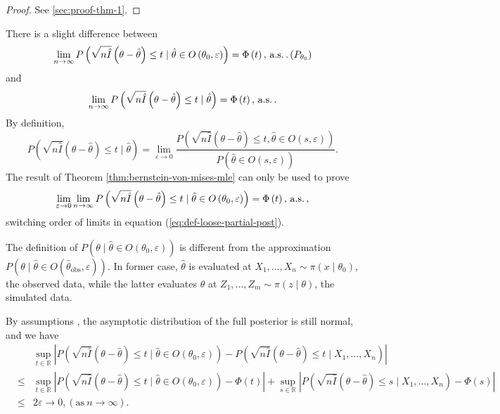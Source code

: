 \begin{proof}
See  \ref{sec:proof-thm-1}.\end{proof}
\begin{rem}
There is a slight difference between 
\[
\lim_{n\rightarrow\infty}P\left(\sqrt{n\hat{I}}\left(\theta-\hat{\theta}\right)\le t\mid\hat{\theta}\in O\left(\theta_{0},\varepsilon\right)\right)=\Phi\left(t\right),\,\mathrm{a.s.}\,.\left(P_{\theta_{0}}\right)
\]
and 
\[
\lim_{n\rightarrow\infty}P\left(\sqrt{n\hat{I}}\left(\theta-\hat{\theta}\right)\le t\mid\hat{\theta}\right)=\Phi\left(t\right),\,\mathrm{a.s.}\,.
\]
By definition, 
\begin{equation}
P\left(\sqrt{n\hat{I}}\left(\theta-\hat{\theta}\right)\le t\mid\hat{\theta}\right)=\lim_{\varepsilon\rightarrow0}\frac{P\left(\sqrt{n\hat{I}}\left(\theta-\hat{\theta}\right)\le t,\hat{\theta}\in O\left(s,\varepsilon\right)\right)}{P\left(\hat{\theta}\in O\left(s,\varepsilon\right)\right)}.\label{eq:def-loose-partial-post}
\end{equation}
The result of Theorem \ref{thm:bernstein-von-mises-mle} can only
be used to prove 
\[
\lim_{\varepsilon\rightarrow0}\lim_{n\rightarrow\infty}P\left(\sqrt{n\hat{I}}\left(\theta-\hat{\theta}\right)\le t\mid\hat{\theta}\in O\left(\theta_{0},\varepsilon\right)\right)=\Phi\left(t\right),\,\mathrm{a.s.}\,,
\]
switching order of limits in equation (\ref{eq:def-loose-partial-post}). 
\begin{rem}
The definition of $P\left(\theta\mid\hat{\theta}\in O\left(\theta_{0},\varepsilon\right)\right)$
is different from the approximation $P\left(\theta\mid\hat{\theta}\in O\left(\hat{\theta}_{\mathrm{obs}},\varepsilon\right)\right)$.
In former case, $\hat{\theta}$ is evaluated at $X_{1},\ldots,X_{n}\sim\pi\left(x\mid\theta_{0}\right)$,
the observed data, while the latter evaluates $\hat{\theta}$ at $Z_{1},\ldots,Z_{m}\sim\pi\left(z\mid\theta\right)$,
the simulated data. 
\end{rem}
\end{rem}
By {assumptions }, the asymptotic
distribution of the full posterior is still normal, and we have 
\begin{eqnarray*}
 &  & \sup_{t\in\mathbb{R}}\left|P\left(\sqrt{n\hat{I}}\left(\theta-\hat{\theta}\right)\le t\mid\hat{\theta}\in O\left(\theta_{0},\varepsilon\right)\right)-P\left(\sqrt{n\hat{I}}\left(\theta-\hat{\theta}\right)\le t\mid X_{1},\ldots,X_{n}\right)\right|\\
 & \le & \sup_{t\in\mathbb{R}}\left|P\left(\sqrt{n\hat{I}}\left(\theta-\hat{\theta}\right)\le t\mid\hat{\theta}\in O\left(\theta_{0},\varepsilon\right)\right)-\Phi\left(t\right)\right|+\sup_{s\in\mathbb{R}}\left|P\left(\sqrt{n\hat{I}}\left(\theta-\hat{\theta}\right)\le s\mid X_{1},\ldots,X_{n}\right)-\Phi\left(s\right)\right|\\
 & \le & 2\varepsilon\rightarrow0,\left(\mathrm{as}\: n\rightarrow\infty\right).
\end{eqnarray*}
